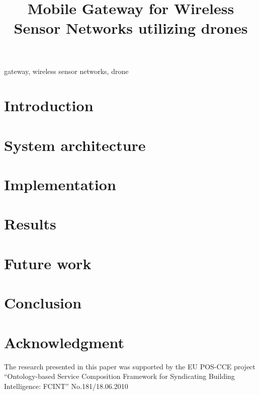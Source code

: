 \documentclass[conference]{IEEEtran}
\begin{document}
\title{Mobile Gateway for Wireless Sensor Networks utilizing drones}



\author{
  }

\maketitle

\begin{abstract} 

\cite{doroftei2007omnidirectional}
\end{abstract}

\begin{IEEEkeywords}
gateway, wireless sensor networks, drone
\end{IEEEkeywords}

\section{Introduction}
\label{sec:introduction}


\section{System architecture}
\label{sec:architecture}


\section{Implementation}
\label{sec:implementation}



\section{Results} 
\label{sec:results}


\section{Future work} 
\label{sec:future}


\section{Conclusion}
\label{sec:conclusion}



\section*{Acknowledgment}
\label{sec:acknowledgment}

The research presented in this paper was supported by the EU POS-CCE project
“Ontology-based Service Composition Framework for Syndicating Building
Intelligence: FCINT” No.181/18.06.2010




\end{document}
